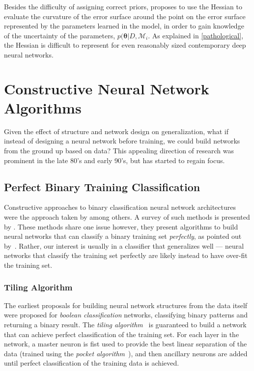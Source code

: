\documentclass[thesis]{subfiles}
\begin{document}
Besides the difficulty of assigning correct priors, \citet{mackay1992practical} proposes to use the Hessian to evaluate the curvature of the error surface around the point on the error surface represented by the parameters learned in the model, in order to gain knowledge of the uncertainty of the parameters, \ie{}$p(\mathbf{\theta}|D,\mathcal{M}_i$. As explained in \cref{pathological}, the Hessian is difficult to represent for even reasonably sized contemporary deep neural networks.

\section{Constructive Neural Network Algorithms}
	Given the effect of structure and network design on generalization, what if instead of designing a neural network before training, we could build networks from the ground up based on data? This appealing direction of research was prominent in the late 80's and early 90's, but has started to regain focus. 	
	\subsection{Perfect Binary Training Classification}
Constructive approaches to binary classification neural network architectures were the approach taken by \citet{mezard1989learning,Fahlman1989,frean1990upstart} among others. A survey of such methods is presented by \citet{parekh2000constructive}. These methods share one issue however, they  present algorithms to build neural networks that can classify a binary training set \emph{perfectly}, as pointed out by~\citet{Bishop1995}. Rather, our interest is usually in a classifier that generalizes well --- neural networks that classify the training set perfectly are likely instead to have over-fit the training set.
	
	\subsubsection{Tiling Algorithm}\label{tilingalgo}
	The earliest proposals for building neural network structures from the data itself were proposed for \emph{boolean classification} networks, \ie classifying binary patterns and returning a binary result. The \emph{tiling algorithm}~\citep{mezard1989learning} is guaranteed to build a network that can achieve perfect classification of the training set. For each layer in the network, a master neuron is fist used to provide the best linear separation of the data (trained using the \emph{pocket algorithm}~\citep{gallant1986optimal}), and then ancillary neurons are added until perfect classification of the training data is achieved. 
	
\end{document}
